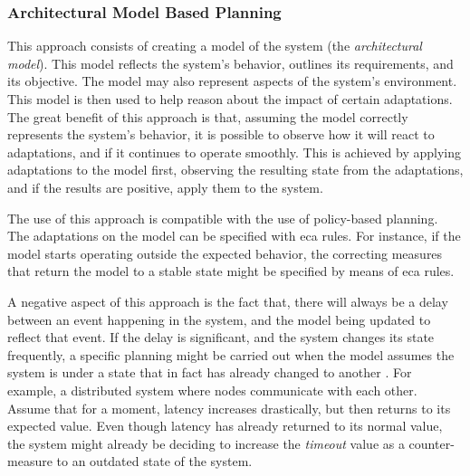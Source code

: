 \subsubsection{Architectural Model Based Planning}
\label{ssec:architectural_model}
This approach consists of creating a model of the system (the \textit{architectural model}). This model reflects the system's behavior, outlines its requirements, and its objective. The model may also represent aspects of the system's environment. This model is then used to help reason about the impact of certain adaptations. The great benefit of this approach is that, assuming the model correctly represents the system's behavior, it is possible to observe how it will react to adaptations, and if it continues to operate smoothly. This is achieved by applying adaptations to the model first, observing the resulting state from the adaptations, and if the results are positive, apply them to the system.
\par The use of this approach is compatible with the use of policy-based planning. The adaptations on the model can be specified with \gls{eca} rules. For instance, if the model starts operating outside the expected behavior, the correcting measures that return the model to a stable state might be specified by means of \gls{eca} rules.
\par A negative aspect of this approach is the fact that, there will always be a delay between an event happening in the system, and the model being updated to reflect that event. If the delay is significant, and the system changes its state frequently, a specific planning might be carried out when the model assumes the system is under a state that in fact has already changed to another \cite{Huebscher2008}. For example, a distributed system where nodes communicate with each other. Assume that for a moment, latency increases drastically, but then returns to its expected value. Even though latency has already returned to its normal value, the system might already be deciding to increase the \textit{timeout} value as a counter-measure to an outdated state of the system. %
